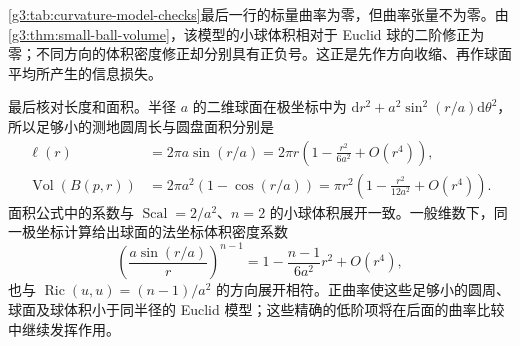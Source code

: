 \cref{g3:tab:curvature-model-checks}最后一行的标量曲率为零，但曲率张量不为零。由\cref{g3:thm:small-ball-volume}，该模型的小球体积相对于 Euclid 球的二阶修正为零；不同方向的体积密度修正却分别具有正负号。这正是先作方向收缩、再作球面平均所产生的信息损失。

\ProseParagraphBreak

最后核对长度和面积。半径 \(a\) 的二维球面在极坐标中为 \(\mathrm dr^2+a^2\sin^2(r/a)\mathrm d\theta^2\)，所以足够小的测地圆周长与圆盘面积分别是
\[
	\begin{aligned}
	\ell(r)&=2\pi a\sin(r/a)
	=2\pi r\left(1-\frac{r^2}{6a^2}+O(r^4)\right),\\
	\operatorname{Vol}(B(p,r))&=2\pi a^2(1-\cos(r/a))
	=\pi r^2\left(1-\frac{r^2}{12a^2}+O(r^4)\right).
	\end{aligned}
\]
面积公式中的系数与 \(\operatorname{Scal}=2/a^2\)、\(n=2\) 的小球体积展开一致。一般维数下，同一极坐标计算给出球面的法坐标体积密度系数
\[
	\left(\frac{a\sin(r/a)}r\right)^{n-1}
	=1-\frac{n-1}{6a^2}r^2+O(r^4),
\]
也与 \(\operatorname{Ric}(u,u)=(n-1)/a^2\) 的方向展开相符。正曲率使这些足够小的圆周、球面及球体积小于同半径的 Euclid 模型；这些精确的低阶项将在后面的曲率比较中继续发挥作用。
